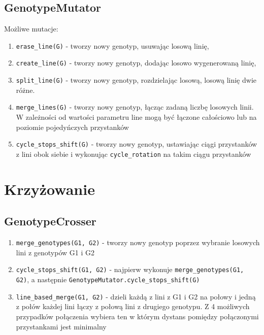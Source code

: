 \documentclass[12pt,a4paper,openright]{mwrep}
\begin{document}
\subsection{GenotypeMutator}

Możliwe mutacje:

\begin{enumerate}
    \item \lstinline{erase_line(G)} - tworzy nowy genotyp, usuwając losową linię,
    \item \lstinline{create_line(G)} - tworzy nowy genotyp, dodając losowo wygenerowaną linię,
    \item \lstinline{split_line(G)} - tworzy nowy genotyp, rozdzielając losową, losową linię dwie różne.
    \item \lstinline{merge_lines(G)} - tworzy nowy genotyp, łącząc zadaną liczbę losowych linii. W zależności od wartości parametru line mogą być łączone całościowo lub na poziomie pojedyńczych przystanków
    \item \lstinline{cycle_stops_shift(G)} - tworzy nowy genotyp, ustawiając ciągi przystanków z lini obok siebie i wykonując \lstinline{cycle_rotation} na takim ciągu przystanków
\end{enumerate}

\section{Krzyżowanie}

\subsection{GenotypeCrosser}

\begin{enumerate}
    \item \lstinline{merge_genotypes(G1, G2)} - tworzy nowy genotyp poprzez wybranie losowych lini z genotypów G1 i G2
    \item \lstinline{cycle_stops_shift(G1, G2)} - najpierw wykonuje \lstinline{merge_genotypes(G1, G2)}, a następnie \lstinline{GenotypeMutator.cycle_stops_shift(G)}
    \item \lstinline{line_based_merge(G1, G2)} - dzieli każdą z lini z G1 i G2 na połowy i jedną z połów każdej lini łączy z połową lini z drugiego genotypu. Z 4 możliwych przypadków połączenia wybiera ten w którym dystans pomiędzy połączonymi przystankami jest minimalny
\end{enumerate}
\end{document}
